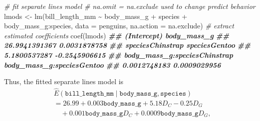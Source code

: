 \documentclass[
]{book}
\newenvironment{Shaded}{\begin{snugshade}}{\end{snugshade}}
\newcommand{\AttributeTok}[1]{\textcolor[rgb]{0.77,0.63,0.00}{#1}}
\newcommand{\CommentTok}[1]{\textcolor[rgb]{0.56,0.35,0.01}{\textit{#1}}}
\newcommand{\DocumentationTok}[1]{\textcolor[rgb]{0.56,0.35,0.01}{\textbf{\textit{#1}}}}
\newcommand{\FunctionTok}[1]{\textcolor[rgb]{0.00,0.00,0.00}{#1}}
\newcommand{\NormalTok}[1]{#1}
\newcommand{\OtherTok}[1]{\textcolor[rgb]{0.56,0.35,0.01}{#1}}
\newcommand{\SpecialCharTok}[1]{\textcolor[rgb]{0.00,0.00,0.00}{#1}}
\theoremstyle{definition}
\theoremstyle{definition}
\theoremstyle{definition}
\theoremstyle{definition}
\theoremstyle{remark}
\begin{document}
\begin{Shaded}
\begin{Highlighting}[]
\CommentTok{\# fit separate lines model}
\CommentTok{\# na.omit = na.exclude used to change predict behavior}
\NormalTok{lmods }\OtherTok{\textless{}{-}} \FunctionTok{lm}\NormalTok{(bill\_length\_mm }\SpecialCharTok{\textasciitilde{}}\NormalTok{ body\_mass\_g }\SpecialCharTok{+}\NormalTok{ species }\SpecialCharTok{+}\NormalTok{ body\_mass\_g}\SpecialCharTok{:}\NormalTok{species,}
            \AttributeTok{data =}\NormalTok{ penguins, }\AttributeTok{na.action =}\NormalTok{ na.exclude)}
\CommentTok{\# extract estimated coefficients}
\FunctionTok{coef}\NormalTok{(lmods)}
\DocumentationTok{\#\#                  (Intercept)                  body\_mass\_g }
\DocumentationTok{\#\#                26.9941391367                 0.0031878758 }
\DocumentationTok{\#\#             speciesChinstrap                speciesGentoo }
\DocumentationTok{\#\#                 5.1800537287                {-}0.2545906615 }
\DocumentationTok{\#\# body\_mass\_g:speciesChinstrap    body\_mass\_g:speciesGentoo }
\DocumentationTok{\#\#                 0.0012748183                 0.0009029956}
\end{Highlighting}
\end{Shaded}

Thus, the fitted separate lines model is
\[
\begin{aligned}
&\hat{E}(\mathtt{bill\_length\_mm} \mid \mathtt{body\_mass\_g}, \mathtt{species}) \\
&= 26.99 + 0.003 \mathtt{body\_mass\_g} + 5.18 D_C - 0.25 D_G \\
&\quad + 0.001 \mathtt{body\_mass\_g} D_C + 0.0009 \mathtt{body\_mass\_g} D_G, \label{eq:sl-model-penguins}
\end{aligned}
\]
\end{document}
